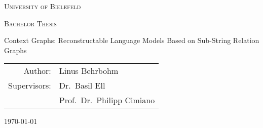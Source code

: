 \thispagestyle{empty}


\def\mytitle{Context Graphs: Reconstructable Language Models Based on Sub-String Relation Graphs}
\def\myauthor{Linus Behrbohm}

\makeatletter
\begin{titlepage}
	\centering
	{\LARGE \textsc{University of Bielefeld}\par}
	\vspace{1cm}
	{\Large \textsc{Bachelor Thesis}\par}
	\vspace{1.5cm}
	{\huge \mytitle\par}
	\vfill
    \begin{tabular}{r@{ }l} 
        Author:      & \myauthor \\[1ex] 
        Supervisors: & Dr.\ Basil Ell\\
                     & Prof.\ Dr.\ Philipp Cimiano
    \end{tabular}

	\vfill

	{\large \today\par}
\end{titlepage}
\makeatother



%
%